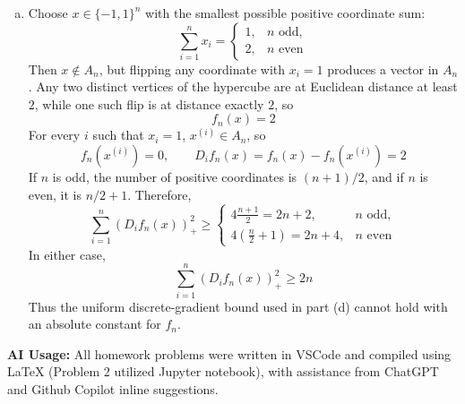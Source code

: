 \documentclass[11pt,a4paper,margin=1in]{article}
\begin{document}
\begin{enumerate}[(a)]
    \item Choose $x\in\{-1,1\}^n$ with the smallest possible positive coordinate sum:
    \[
        \sum_{i=1}^n x_i=
        \begin{cases}
            1, & n\text{ odd},\\
            2, & n\text{ even}
        \end{cases}
    \]
    Then $x\notin A_n$, but flipping any coordinate with $x_i=1$ produces a vector 
    in $A_n$. Any two distinct vertices of the hypercube are at Euclidean distance 
    at least $2$, while one such flip is at distance exactly $2$, so
    \[
        f_n(x)=2
    \]
    For every $i$ such that $x_i=1$, $x^{(i)}\in A_n$, so
    \[
        f_n(x^{(i)})=0,
        \qquad
        D_i f_n(x)=f_n(x)-f_n(x^{(i)})=2
    \]
    If $n$ is odd, the number of positive coordinates is $(n+1)/2$, and if $n$ is 
    even, it is $n/2+1$. Therefore,
    \[
        \sum_{i=1}^n(D_i f_n(x))_+^2
        \geq
        \begin{cases}
            4\frac{n+1}{2}=2n+2, & n\text{ odd},\\
            4\left(\frac n2+1\right)=2n+4, & n\text{ even}
        \end{cases}
    \]
    In either case,
    \[
        \sum_{i=1}^n(D_i f_n(x))_+^2\geq2n
    \]
    Thus the uniform discrete-gradient bound used in part (d) cannot hold with an 
    absolute constant for $f_n$.
\end{enumerate}

\noindent
\textbf{AI Usage:} All homework problems were written in VSCode and compiled using LaTeX
(Problem 2 utilized Jupyter notebook), with assistance from ChatGPT and Github
Copilot inline suggestions.
\end{document}
